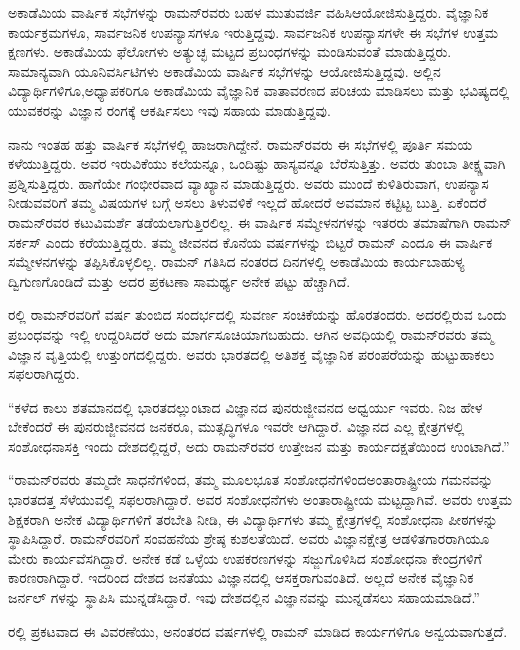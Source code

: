 ಅಕಾಡೆಮಿಯ ವಾರ್ಷಿಕ ಸಭೆಗಳನ್ನು ರಾಮನ್‍ರವರು ಬಹಳ ಮುತುವರ್ಜಿ ವಹಿಸಿ\break ಆಯೋಜಿಸುತ್ತಿದ್ದರು. ವೈಜ್ಞಾನಿಕ ಕಾರ್ಯಕ್ರಮಗಳೂ, ಸಾರ್ವಜನಿಕ ಉಪನ್ಯಾಸಗಳೂ ಇರುತ್ತಿದ್ದವು. ಸಾರ್ವಜನಿಕ ಉಪನ್ಯಾಸಗಳೇ ಈ ಸಭೆಗಳ ಉತ್ತಮ ಕ್ಷಣಗಳು. ಅಕಾಡೆಮಿಯ ಫೆಲೋಗಳು ಅತ್ಯುಚ್ಛ ಮಟ್ಟದ ಪ್ರಬಂಧಗಳನ್ನು ಮಂಡಿಸುವಂತೆ ಮಾಡುತ್ತಿದ್ದರು. ಸಾಮಾನ್ಯವಾಗಿ ಯೂನಿವರ್ಸಿಟಿಗಳು ಅಕಾಡೆಮಿಯ ವಾರ್ಷಿಕ ಸಭೆಗಳನ್ನು ಆಯೋಜಿಸುತ್ತಿದ್ದವು. ಅಲ್ಲಿನ ವಿದ್ಯಾರ್ಥಿಗಳಿಗೂ,\break ಅಧ್ಯಾಪಕರಿಗೂ ಅಕಾಡೆಮಿಯ ವೈಜ್ಞಾನಿಕ ವಾತಾವರಣದ ಪರಿಚಯ ಮಾಡಿಸಲು ಮತ್ತು ಭವಿಷ್ಯದಲ್ಲಿ ಯುವಕರನ್ನು ವಿಜ್ಞಾನ ರಂಗಕ್ಕೆ ಆಕರ್ಷಿಸಲು ಇವು ಸಹಾಯ ಮಾಡುತ್ತಿದ್ದವು.

ನಾನು ಇಂತಹ ಹತ್ತು ವಾರ್ಷಿಕ ಸಭೆಗಳಲ್ಲಿ ಹಾಜರಾಗಿದ್ದೇನೆ. ರಾಮನ್‍ರವರು ಈ ಸಭೆಗಳಲ್ಲಿ ಪೂರ್ತಿ ಸಮಯ ಕಳೆಯುತ್ತಿದ್ದರು. ಅವರ ಇರುವಿಕೆಯು ಕಲೆಯನ್ನೂ, ಒಂದಿಷ್ಟು ಹಾಸ್ಯವನ್ನೂ ಬೆರೆಸುತ್ತಿತ್ತು. ಅವರು ತುಂಬಾ ತೀಕ್ಷ್ಣವಾಗಿ ಪ್ರಶ್ನಿಸುತ್ತಿದ್ದರು. ಹಾಗೆಯೇ ಗಂಭೀರವಾದ ವ್ಯಾಖ್ಯಾನ ಮಾಡುತ್ತಿದ್ದರು. ಅವರು ಮುಂದೆ ಕುಳಿತಿರುವಾಗ, ಉಪನ್ಯಾಸ ನೀಡುವವರಿಗೆ ತಮ್ಮ ವಿಷಯಗಳ ಬಗ್ಗೆ ಅಸಲು ತಿಳುವಳಿಕೆ ಇಲ್ಲದೆ ಹೋದರೆ ಅವಮಾನ ಕಟ್ಟಿಟ್ಟ ಬುತ್ತಿ. ಏಕೆಂದರೆ ರಾಮನ್‍ರವರ ಕಟುವಿಮರ್ಶೆ ತಡೆಯಲಾಗುತ್ತಿರಲಿಲ್ಲ. ಈ ವಾರ್ಷಿಕ ಸಮ್ಮೇಳನಗಳನ್ನು ಇತರರು ತಮಾಷೆಗಾಗಿ ರಾಮನ್ ಸರ್ಕಸ್ ಎಂದು ಕರೆಯುತ್ತಿದ್ದರು. ತಮ್ಮ ಜೀವನದ ಕೊನೆಯ ವರ್ಷಗಳನ್ನು ಬಿಟ್ಟರೆ ರಾಮನ್ ಎಂದೂ ಈ ವಾರ್ಷಿಕ ಸಮ್ಮೇಳನಗಳನ್ನು ತಪ್ಪಿಸಿಕೊಳ್ಳಲಿಲ್ಲ. ರಾಮನ್ ಗತಿಸಿದ ನಂತರದ ದಿನಗಳಲ್ಲಿ ಅಕಾಡೆಮಿಯ ಕಾರ್ಯಬಾಹುಳ್ಯ ದ್ವಿಗುಣಗೊಂಡಿದೆ ಮತ್ತು ಅದರ ಪ್ರಕಟಣಾ ಸಾಮರ್ಥ್ಯ ಅನೇಕ ಪಟ್ಟು ಹೆಚ್ಚಾಗಿದೆ.

ರಲ್ಲಿ ರಾಮನ್‍ರವರಿಗೆ  ವರ್ಷ ತುಂಬಿದ ಸಂದರ್ಭದಲ್ಲಿ ಸುವರ್ಣ ಸಂಚಿಕೆಯನ್ನು ಹೊರತಂದರು. ಅದರಲ್ಲಿರುವ ಒಂದು ಪ್ರಬಂಧವನ್ನು ಇಲ್ಲಿ ಉದ್ದರಿಸಿದರೆ ಅದು ಮಾರ್ಗಸೂಚಿ\-ಯಾಗಬಹುದು. ಆಗಿನ ಅವಧಿಯಲ್ಲಿ ರಾಮನ್‍ರವರು ತಮ್ಮ ವಿಜ್ಞಾನ ವೃತ್ತಿಯಲ್ಲಿ ಉತ್ತುಂಗದಲ್ಲಿದ್ದರು. ಅವರು ಭಾರತದಲ್ಲಿ ಅತಿಶಕ್ತ ವೈಜ್ಞಾನಿಕ ಪರಂಪರೆಯನ್ನು ಹುಟ್ಟುಹಾಕಲು ಸಫಲರಾಗಿದ್ದರು.

\enginline{-}“ಕಳೆದ ಕಾಲು ಶತಮಾನದಲ್ಲಿ ಭಾರತದಲ್ಲುಂಟಾದ ವಿಜ್ಞಾನದ ಪುನರುಜ್ಜೀವನದ ಅಧ್ವರ್ಯು ಇವರು. ನಿಜ ಹೇಳ ಬೇಕೆಂದರೆ ಈ ಪುನರುಜ್ಜೀವನದ ಜನಕರೂ, ಮುತ್ಸದ್ಧಿಗಳೂ ಇವರೇ ಆಗಿದ್ದಾರೆ. ವಿಜ್ಞಾನದ ಎಲ್ಲ ಕ್ಷೇತ್ರಗಳಲ್ಲಿ ಸಂಶೋಧನಾಸಕ್ತಿ ಇಂದು ದೇಶದಲ್ಲಿದ್ದರೆ, ಅದು ರಾಮನ್‍ರವರ ಉತ್ತೇಜನ ಮತ್ತು ಕಾರ್ಯದಕ್ಷತೆಯಿಂದ ಉಂಟಾಗಿದೆ.”

“ರಾಮನ್‍ರವರು ತಮ್ಮದೇ ಸಾಧನೆಗಳಿಂದ, ತಮ್ಮ ಮೂಲಭೂತ ಸಂಶೋಧನೆಗಳಿಂದ\break ಅಂತಾರಾಷ್ಟ್ರೀಯ ಗಮನವನ್ನು ಭಾರತದತ್ತ ಸೆಳೆಯುವಲ್ಲಿ ಸಫಲರಾಗಿದ್ದಾರೆ. ಅವರ ಸಂಶೋಧನೆಗಳು ಅಂತಾರಾಷ್ಟ್ರೀಯ ಮಟ್ಟದ್ದಾಗಿವೆ. ಅವರು ಉತ್ತಮ ಶಿಕ್ಷಕರಾಗಿ ಅನೇಕ ವಿದ್ಯಾರ್ಥಿಗಳಿಗೆ ತರಬೇತಿ ನೀಡಿ, ಈ ವಿದ್ಯಾರ್ಥಿಗಳು ತಮ್ಮ ಕ್ಷೇತ್ರಗಳಲ್ಲಿ ಸಂಶೋಧನಾ ಪೀಠಗಳನ್ನು ಸ್ಥಾಪಿಸಿದ್ದಾರೆ. ರಾಮನ್\-‍ರವರಿಗೆ ಸಂವಹನೆಯ ಶ್ರೇಷ್ಠ ಕುಶಲತೆಯಿದೆ. ಅವರು ವಿಜ್ಞಾನಕ್ಷೇತ್ರ ಆಡಳಿತಗಾರರಾಗಿಯೂ ಮೇರು ಕಾರ್ಯವೆಸಗಿದ್ದಾರೆ. ಅನೇಕ ಕಡೆ ಒಳ್ಳೆಯ ಉಪಕರಣಗಳನ್ನು ಸಜ್ಜುಗೊಳಿಸಿದ ಸಂಶೋಧನಾ ಕೇಂದ್ರಗಳಿಗೆ ಕಾರಣರಾಗಿದ್ದಾರೆ. ಇದರಿಂದ ದೇಶದ ಜನತೆಯು ವಿಜ್ಞಾನದಲ್ಲಿ ಆಸಕ್ತರಾಗುವಂತಿದೆ. ಅಲ್ಲದೆ ಅನೇಕ ವೈಜ್ಞಾನಿಕ ಜರ್ನಲ್ ಗಳನ್ನು ಸ್ಥಾಪಿಸಿ ಮುನ್ನಡೆಸಿದ್ದಾರೆ. ಇವು ದೇಶದಲ್ಲಿನ ವಿಜ್ಞಾನವನ್ನು ಮುನ್ನಡೆಸಲು ಸಹಾಯಮಾಡಿದೆ.”

ರಲ್ಲಿ ಪ್ರಕಟವಾದ ಈ ವಿವರಣೆಯು, ಅನಂತರದ ವರ್ಷಗಳಲ್ಲಿ ರಾಮನ್ ಮಾಡಿದ ಕಾರ್ಯಗಳಿಗೂ ಅನ್ವಯವಾಗುತ್ತದೆ.

